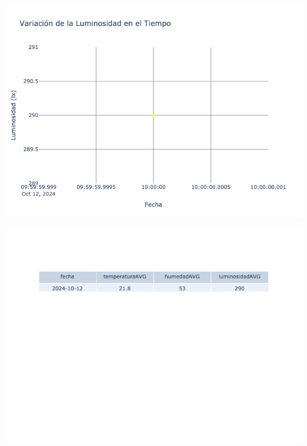 \documentclass{article}
\begin{document}
    \noindent
    \begin{minipage}{0.48\textwidth}
        \centering
        \includegraphics[width=\textwidth]{../img/poli/LS501-90Dias-03-12-2024.png}
    \end{minipage}
    \hfill
    \begin{minipage}{0.48\textwidth}
        \centering
        \includegraphics[width=\textwidth]{../img/tables/CAVG501-90Dias-03-12-2024.png}
    \end{minipage}
    
\end{document}
